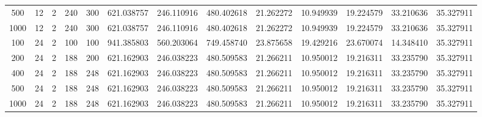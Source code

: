 \begin{table}[h]
\begin{tabular}{ccccccccccccc}
500 & 12 & 2 & 240 & 300 & 621.038757 & 246.110916 & 480.402618 & 21.262272 & 10.949939 & 19.224579 & 33.210636 & 35.327911 \\
1000 & 12 & 2 & 240 & 300 & 621.038757 & 246.110916 & 480.402618 & 21.262272 & 10.949939 & 19.224579 & 33.210636 & 35.327911 \\
100 & 24 & 2 & 100 & 100 & 941.385803 & 560.203064 & 749.458740 & 23.875658 & 19.429216 & 23.670074 & 14.348410 & 35.327911 \\
200 & 24 & 2 & 188 & 200 & 621.162903 & 246.038223 & 480.509583 & 21.266211 & 10.950012 & 19.216311 & 33.235790 & 35.327911 \\
400 & 24 & 2 & 188 & 248 & 621.162903 & 246.038223 & 480.509583 & 21.266211 & 10.950012 & 19.216311 & 33.235790 & 35.327911 \\
500 & 24 & 2 & 188 & 248 & 621.162903 & 246.038223 & 480.509583 & 21.266211 & 10.950012 & 19.216311 & 33.235790 & 35.327911 \\
1000 & 24 & 2 & 188 & 248 & 621.162903 & 246.038223 & 480.509583 & 21.266211 & 10.950012 & 19.216311 & 33.235790 & 35.327911 \\
\bottomrule
\end{tabular}
\end{table}
